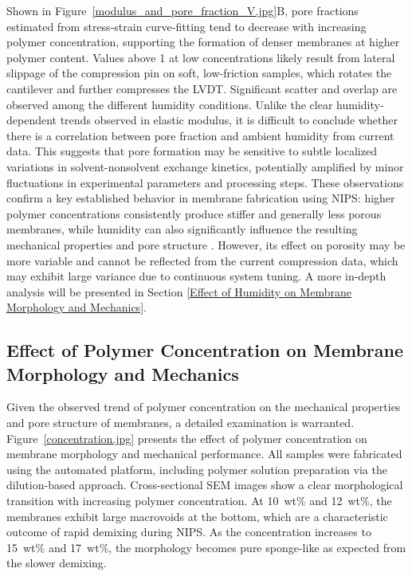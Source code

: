 \documentclass[preprint,12pt,times]{elsarticle}
\begin{document}
Shown in Figure~\ref{modulus_and_pore_fraction_V.jpg}B, pore fractions estimated from stress-strain curve-fitting tend to decrease with increasing polymer concentration, supporting the formation of denser membranes at higher polymer content. Values above 1 at low concentrations likely result from lateral slippage of the compression pin on soft, low-friction samples, which rotates the cantilever and further compresses the LVDT. Significant scatter and overlap are observed among the different humidity conditions. Unlike the clear humidity-dependent trends observed in elastic modulus, it is difficult to conclude whether there is a correlation between pore fraction and ambient humidity from current data. This suggests that pore formation may be sensitive to subtle localized variations in solvent-nonsolvent exchange kinetics, potentially amplified by minor fluctuations in experimental parameters and processing steps. These observations confirm a key established behavior in membrane fabrication using NIPS: higher polymer concentrations consistently produce stiffer and generally less porous membranes, while humidity can also significantly influence the resulting mechanical properties and pore structure \cite{ZOLFAGHARI2018813, Bohr2023}. However, its effect on porosity may be more variable and cannot be reflected from the current compression data, which may exhibit large variance due to continuous system tuning. A more in-depth analysis will be presented in Section \ref{Effect of Humidity on Membrane Morphology and Mechanics}.


\subsection{Effect of Polymer Concentration on Membrane Morphology and Mechanics}

Given the observed trend of polymer concentration on the mechanical properties and pore structure of membranes, a detailed examination is warranted. Figure~\ref{concentration.jpg} presents the effect of polymer concentration on membrane morphology and mechanical performance. All samples were fabricated using the automated platform, including polymer solution preparation via the dilution-based approach. Cross-sectional SEM images show a clear morphological transition with increasing polymer concentration. At 10~wt\% and 12~wt\%, the membranes exhibit large macrovoids at the bottom, which are a characteristic outcome of rapid demixing during NIPS. As the concentration increases to 15~wt\% and 17~wt\%, the morphology becomes pure sponge-like as expected from the slower demixing.
\end{document}
